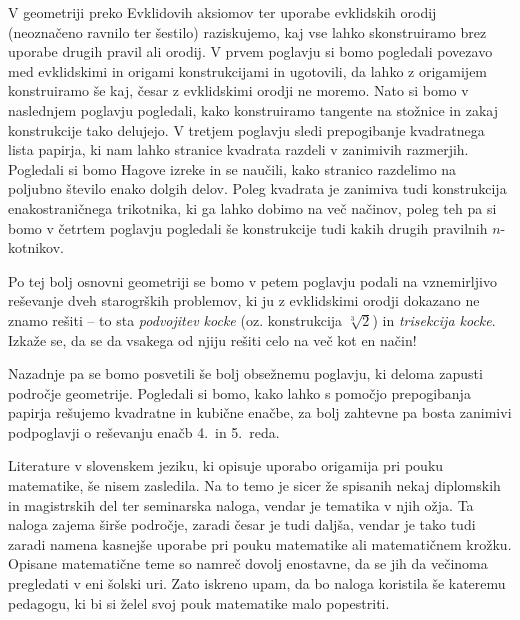 V geometriji preko Evklidovih aksiomov ter uporabe evklidskih orodij (neoznačeno ravnilo ter šestilo) raziskujemo, kaj vse lahko skonstruiramo brez uporabe drugih pravil ali orodij. V prvem poglavju si bomo pogledali povezavo med evklidskimi in origami konstrukcijami in ugotovili, da lahko z origamijem konstruiramo še kaj, česar z evklidskimi orodji ne moremo. Nato si bomo v naslednjem poglavju pogledali, kako konstruiramo tangente na stožnice in zakaj konstrukcije tako delujejo. V tretjem poglavju sledi prepogibanje kvadratnega lista papirja, ki nam lahko stranice kvadrata razdeli v zanimivih razmerjih. Pogledali si bomo Hagove izreke in se naučili, kako stranico razdelimo na poljubno število enako dolgih delov. Poleg kvadrata je zanimiva tudi konstrukcija enakostraničnega trikotnika, ki ga lahko dobimo na več načinov, poleg teh pa si bomo v četrtem poglavju pogledali še konstrukcije tudi kakih drugih pravilnih $n$-kotnikov.

Po tej bolj osnovni geometriji se bomo v petem poglavju podali na vznemirljivo reševanje dveh starogrških problemov, ki ju z evklidskimi orodji dokazano ne znamo rešiti -- to sta \emph{podvojitev kocke} (oz. konstrukcija $\sqrt[3]{2}$) in \emph{trisekcija kocke}. Izkaže se, da se da vsakega od njiju rešiti celo na več kot en način!

Nazadnje pa se bomo posvetili še bolj obsežnemu poglavju, ki deloma zapusti področje geometrije. Pogledali si bomo, kako lahko s pomočjo prepogibanja papirja rešujemo kvadratne in kubične enačbe, za bolj zahtevne pa bosta zanimivi podpoglavji o reševanju enačb 4.\ in 5.\ reda.

Literature v slovenskem jeziku, ki opisuje uporabo origamija pri pouku matematike, še nisem zasledila. Na to temo je sicer že spisanih nekaj diplomskih in magistrskih del ter seminarska naloga, vendar je tematika v njih ožja. Ta naloga zajema širše področje, zaradi česar je tudi daljša, vendar je tako tudi zaradi namena kasnejše uporabe pri pouku matematike ali matematičnem krožku. Opisane matematične teme so namreč dovolj enostavne, da se jih da večinoma pregledati v eni šolski uri. Zato iskreno upam, da bo naloga koristila še kateremu pedagogu, ki bi si želel svoj pouk matematike malo popestriti.